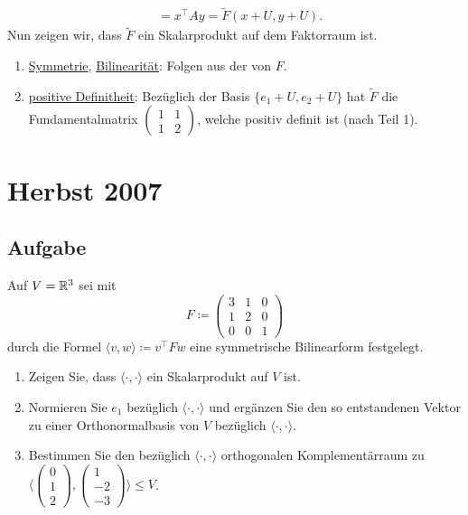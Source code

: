\begin{enumerate}
\begin{align*}
			 &= x^\top Ay = \widetilde{F}(x+U, y+U)\text{.}
		\end{align*}
		Nun zeigen wir, dass \( \widetilde{F} \) ein Skalarprodukt auf dem Faktorraum ist.
		\begin{enumerate}
			\item \underline{Symmetrie}, \underline{Bilinearität}: Folgen aus der von \( F \).
			\item \underline{positive Definitheit}: Bezüglich der Basis \( \{ e_1+U,e_2+U \} \) hat \( \widetilde{F} \) die Fundamentalmatrix \( \left( \begin{smallmatrix}
				1 & 1 \\
				1 & 2
			\end{smallmatrix} \right) \), welche positiv definit ist (nach Teil 1).
		\end{enumerate}
\end{enumerate}

\newpage

\section{Herbst 2007}

\subsection{Aufgabe}
Auf \( V = \mathbb{R}^3 \) sei mit
\begin{equation*}
	F \coloneqq \begin{pmatrix}
		3 & 1 & 0 \\
		1 & 2 & 0 \\
		0 & 0 & 1
	\end{pmatrix}
\end{equation*}
durch die Formel \( \langle v,w \rangle \coloneqq v^\top Fw \) eine symmetrische Bilinearform festgelegt.
\begin{enumerate}
	\item Zeigen Sie, dass \( \langle \cdot, \cdot \rangle \) ein Skalarprodukt auf \( V \) ist.
	\item Normieren Sie \( e_1 \) bezüglich \( \langle \cdot, \cdot \rangle \) und ergänzen Sie den so entstandenen Vektor zu einer Orthonormalbasis von \( V \) bezüglich \( \langle \cdot, \cdot \rangle \).
	\item Bestimmen Sie den bezüglich \( \langle \cdot, \cdot \rangle \) orthogonalen Komplementärraum zu \( \langle \left( \begin{smallmatrix}
		0 \\ 1 \\ 2
	\end{smallmatrix} \right), \left( \begin{smallmatrix}
		1 \\ -2 \\ -3
	\end{smallmatrix} \right) \rangle \leq V \).
\end{enumerate}

